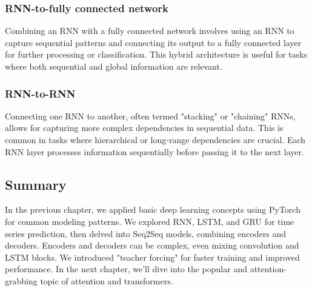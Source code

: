 \documentclass{article}
\begin{document}
\subsubsection{RNN-to-fully connected network}
Combining an RNN with a fully connected network involves using an RNN to capture sequential patterns and connecting its output to a fully connected layer for further processing or classification. This hybrid architecture is useful for tasks where both sequential and global information are relevant.
\subsubsection{RNN-to-RNN}
Connecting one RNN to another, often termed "stacking" or "chaining" RNNs, allows for capturing more complex dependencies in sequential data. This is common in tasks where hierarchical or long-range dependencies are crucial. Each RNN layer processes information sequentially before passing it to the next layer.

\subsection{Summary}
In the previous chapter, we applied basic deep learning concepts using PyTorch for common modeling patterns. We explored RNN, LSTM, and GRU for time series prediction, then delved into Seq2Seq models, combining encoders and decoders. Encoders and decoders can be complex, even mixing convolution and LSTM blocks. We introduced "teacher forcing" for faster training and improved performance. In the next chapter, we'll dive into the popular and attention-grabbing topic of attention and transformers.
\end{document}
